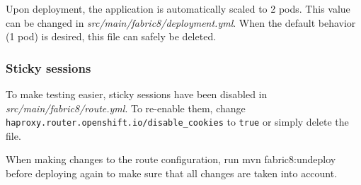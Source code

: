 \documentclass[11pt,a4paper]{article}
\begin{document}
Upon deployment, the application is automatically scaled to 2 pods. This value can be changed in \emph{src/main/fabric8/deployment.yml}. When the default behavior (1 pod) is desired, this file can safely be deleted.

\subsubsection*{Sticky sessions}

To make testing easier, sticky sessions have been disabled in \emph{src/main/fabric8/route.yml}. To re-enable them, change \texttt{haproxy.router.openshift.io/disable\_cookies} to \texttt{true} or simply delete the file.

When making changes to the route configuration, run mvn fabric8:undeploy before deploying again to make sure that all changes are taken into account.

\clearpage
\printbibliography[heading=bibintoc]{}
\end{document}
